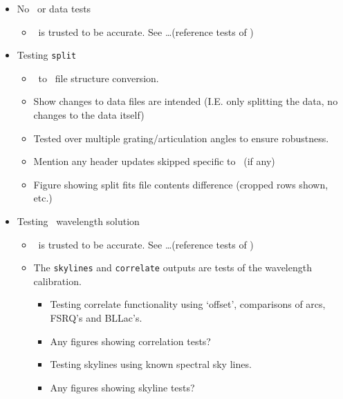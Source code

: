 \begin{itemize}
    \item No \polsalt\ or data tests
    \begin{itemize}
        \item \polsalt\ is trusted to be accurate. See \dots (reference tests of \polsalt)
    \end{itemize}
    
    \item Testing \texttt{split}
    \begin{itemize}
        \item \polsalt\ to \iraf\ file structure conversion.
        \item Show changes to data files are intended (I.E. only splitting the data, no changes to the data itself)
        \item Tested over multiple grating/articulation angles to ensure robustness.
        \item Mention any header updates skipped specific to \polsalt\ (if any)
        \item Figure showing split fits file contents difference (cropped rows shown, etc.)
    \end{itemize}
    
    \item Testing \iraf\ wavelength solution
    \begin{itemize}
        \item \iraf\ is trusted to be accurate. See \dots (reference tests of \iraf)
        \item The \texttt{skylines} and \texttt{correlate} outputs are tests of the wavelength calibration.
        \begin{itemize}
            \item Testing correlate functionality using `offset', comparisons of arcs, FSRQ's and BLLac's.
            \item Any figures showing correlation tests?
            \item Testing skylines using known spectral sky lines.
            \item Any figures showing skyline tests?
        \end{itemize}
    \end{itemize}


\end{itemize}
